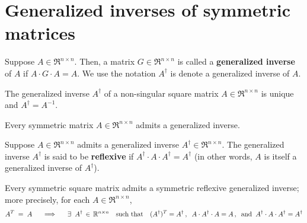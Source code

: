 

\section{Generalized inverses of symmetric matrices}
\setcounter{theorem}{0}
\setcounter{equation}{0}

\renewcommand{\theenumi}{\roman{enumi}}
\renewcommand{\labelenumi}{\textnormal{(\theenumi)}$\;\;$}


\begin{definition}
\mbox{}\vskip 0.1cm\noindent
Suppose $A \in \Re^{n \times n}$.
Then, a matrix $G \in \Re^{n \times n}$ is called a
\textbf{generalized inverse} of $A$ if
$A\cdot G\cdot A = A$.
We use the notation $A^{\dagger}$ is denote
a generalized inverse of $A$.
\end{definition}

\begin{proposition}
\mbox{}\vskip 0.1cm\noindent
The generalized inverse $A^{\dagger}$ of a non-singular square matrix $A \in \Re^{n \times n}$
is unique and $A^{\dagger} = A^{-1}$. 
\end{proposition}

\begin{proposition}
\mbox{}\vskip 0.1cm\noindent
Every symmetric matrix $A \in \Re^{n \times n}$ admits a generalized inverse.
\end{proposition}

\begin{definition}
\mbox{}\vskip 0.1cm\noindent
Suppose $A \in \Re^{n \times n}$ admits a generalized inverse $A^{\dagger} \in \Re^{n \times n}$.
The generalized inverse $A^{\dagger}$ is said to be \textbf{reflexive} if
$A^{\dagger} \cdot A \cdot A^{\dagger} = A^{\dagger}$ (in other words,
$A$ is itself a generalized inverse of $A^{\dagger}$).
\end{definition}

\begin{theorem}
\mbox{}\vskip 0.1cm\noindent
Every symmetric square matrix admits a symmetric reflexive
generalized inverse; more precisely, for each $A \in \Re^{n \times n}$,
\begin{equation*}
A^{T} \;=\; A
\quad\;\;\Longrightarrow\quad\;\;
\exists\;\;A^{\dagger} \,\in\, \Re^{n \times n}
\quad\textnormal{such that}\quad
(A^{\dagger})^{T} = A^{\dagger}\,,\;\;
A \cdot A^{\dagger} \cdot A = A\,,\;\;
\textnormal{and}\;\;
A^{\dagger} \cdot A \cdot A^{\dagger} = A^{\dagger}
\end{equation*}
\end{theorem}



